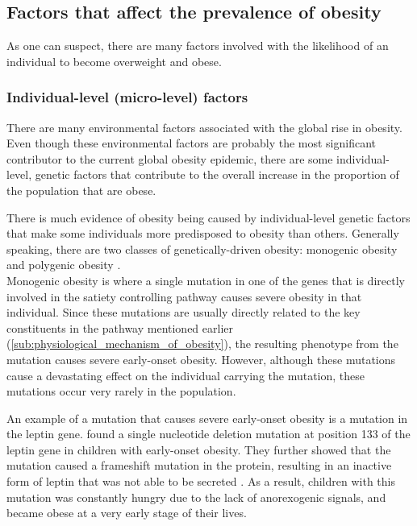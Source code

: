 \subsection{Factors that affect the prevalence of obesity}
\label{sub:factors_that_affect_the_prevalence_of_obesity}

As one can suspect, there are many factors involved with the likelihood of an individual to become overweight and obese.

\subsubsection{Individual-level (micro-level) factors}
\label{ssub:Individual-level_(micro-level)_factors}

There are many environmental factors associated with the global rise in obesity.
Even though these environmental factors are probably the most significant contributor to the current global obesity epidemic, there are some individual-level, genetic factors that contribute to the overall increase in the proportion of the population that are obese.

There is much evidence of obesity being caused by individual-level genetic factors that make some individuals more predisposed to obesity than others.
Generally speaking, there are two classes of genetically-driven obesity: monogenic obesity and polygenic obesity \citep{Moustafa2013}. \\

\noindent
Monogenic obesity is where a single mutation in one of the genes that is directly involved in the satiety controlling pathway causes severe obesity in that individual.
Since these mutations are usually directly related to the key constituents in the pathway mentioned earlier (\cref{sub:physiological_mechanism_of_obesity}), the resulting phenotype from the mutation causes severe early-onset obesity.
However, although these mutations cause a devastating effect on the individual carrying the mutation, these mutations occur very rarely in the population.

An example of a mutation that causes severe early-onset obesity is a mutation in the leptin gene.
\citet{Montague1997} found a single nucleotide deletion mutation at position 133 of the leptin gene in children with early-onset obesity.
They further showed that the mutation caused a frameshift mutation in the protein, resulting in an inactive form of leptin that was not able to be secreted \citep{Montague1997}.
As a result, children with this mutation was constantly hungry due to the lack of anorexogenic signals, and became obese at a very early stage of their lives.
\\

